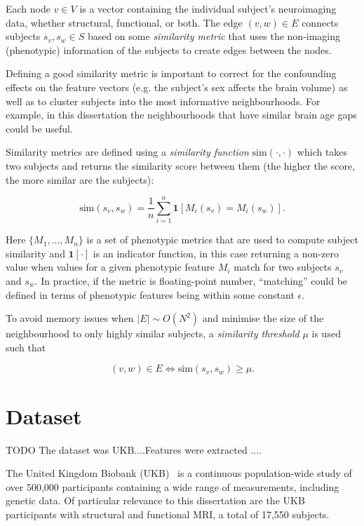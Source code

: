 Each node $v \in V$ is a vector containing the individual subject's neuroimaging data, whether structural, functional, or both. The edge $(v, w) \in E$ connects subjects $s_v, s_w \in S$ based on some \textit{similarity metric} that uses the non-imaging (phenotypic) information of the subjects to create edges between the nodes. 

Defining a good similarity metric is important to correct for the confounding effects on the feature vectors (e.g. the subject's sex affects the brain volume) as well as to cluster subjects into the most informative neighbourhoods. For example, in this dissertation the neighbourhoods that have similar brain age gaps could be useful.

Similarity metrics are defined using a \textit{similarity function} $\mathrm{sim}(\cdot, \cdot)$ which takes two subjects and returns the similarity score between them (the higher the score, the more similar are the subjects):

\begin{equation}
    \mathrm{sim}(s_v, s_w) = \frac{1}{n}\sum_{i=1}^{n} \mathbf{1}[M_i(s_v) = M_i(s_w)].
\end{equation}

Here $\{M_1, \dots, M_n\}$ is a set of phenotypic metrics that are used to compute subject similarity and $\mathbf{1}[\cdot]$ is an indicator function, in this case returning a non-zero value when values for a given phenotypic feature $M_i$ match for two subjects $s_v$ and $s_w$. In practice, if the metric is floating-point number, ``matching'' could be defined in terms of phenotypic features being within some constant $\epsilon$. 

To avoid memory issues when $|E| \sim O(N^2)$ and minimise the size of the neighbourhood to only highly similar subjects, a \textit{similarity threshold} $\mu$ is used such that

\begin{equation}
    (v, w) \in E \iff \mathrm{sim}(s_v, s_w) \geq \mu.
\end{equation}



\section{Dataset}
\label{dataset}

TODO The dataset  was UKB....Features were extracted ....

The United Kingdom Biobank (UKB)~\cite{sudlow2015uk} is a continuous population-wide study of over 500,000 participants containing a wide range of measurements, including genetic data. Of particular relevance to this dissertation are the UKB participants with structural and functional MRI, a total of 17,550 subjects.

